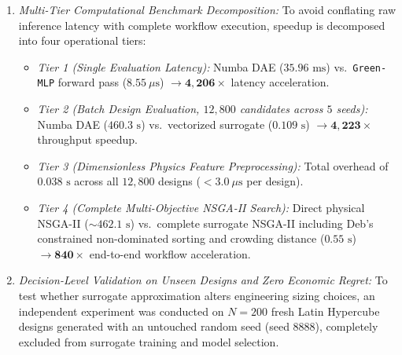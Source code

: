 \documentclass[conference]{IEEEtran}
\begin{document}
\begin{enumerate}
    \textit{Strict Benchmark Specification:} Speedup was benchmarked on a standardized single CPU execution thread (x86\_64 3.4 GHz, 64-bit IEEE-754 precision). Evaluating one full $6$-year ($52,608$-hour) dispatch trajectory using the LLVM-compiled Numba DAE solver requires $35.96\text{ ms}$, whereas a \texttt{Green-MLP} forward pass requires only $8.55\ \mu\text{s}$ ($4,206\times$ speedup over Numba, and $47,659\times$ over interpreted Python ODEs at $407.5\text{ ms}$). In the evolutionary optimization context (sizing $12,800$ candidate designs across $5$ random seeds), direct multi-year DAE simulation would require $460.3\text{ seconds}$ ($\sim 7.7\text{ minutes}$ single-thread, scaling to dozens of CPU-hours when nested within outer Monte Carlo uncertainty loops). The vectorized \texttt{Green-MLP} evaluates all $12,800$ designs in just $0.109\text{ seconds}$ ($0.55\text{ s}$ total including feature transformation and Pareto sorting), establishing the practical necessity of the surrogate for stochastic multi-year planning.
    \item \textit{Multi-Tier Computational Benchmark Decomposition:} To avoid conflating raw inference latency with complete workflow execution, speedup is decomposed into four operational tiers:
    \begin{itemize}
        \item \textit{Tier 1 (Single Evaluation Latency):} Numba DAE ($35.96\text{ ms}$) vs.\ \texttt{Green-MLP} forward pass ($8.55\ \mu\text{s}$) $\to \mathbf{4,206\times}$ latency acceleration.
        \item \textit{Tier 2 (Batch Design Evaluation, $12,800$ candidates across $5$ seeds):} Numba DAE ($460.3\text{ s}$) vs.\ vectorized surrogate ($0.109\text{ s}$) $\to \mathbf{4,223\times}$ throughput speedup.
        \item \textit{Tier 3 (Dimensionless Physics Feature Preprocessing):} Total overhead of $0.038\text{ s}$ across all $12,800$ designs ($<3.0\ \mu\text{s}$ per design).
        \item \textit{Tier 4 (Complete Multi-Objective NSGA-II Search):} Direct physical NSGA-II ($\sim 462.1\text{ s}$) vs.\ complete surrogate NSGA-II including Deb's constrained non-dominated sorting and crowding distance ($0.55\text{ s}$) $\to \mathbf{840\times}$ end-to-end workflow acceleration.
    \end{itemize}

    \item \textit{Decision-Level Validation on Unseen Designs and Zero Economic Regret:} To test whether surrogate approximation alters engineering sizing choices, an independent experiment was conducted on $N=200$ fresh Latin Hypercube designs generated with an untouched random seed (seed 8888), completely excluded from surrogate training and model selection.
    

\end{enumerate}
\end{document}
